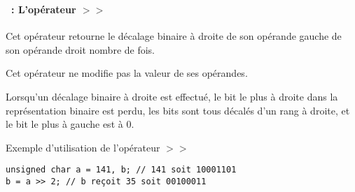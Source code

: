 \begin{frame}[containsverbatim]
  \frametitle{\secname}
  \framesubtitle{\subsecname~: L'opérateur $>>$} 

  Cet opérateur retourne le décalage binaire à droite de son opérande gauche de son opérande droit nombre de fois.
  \par
  Cet opérateur ne modifie pas la valeur de ses opérandes.
  \vspace{0.3cm}
  \par
  Lorsqu'un décalage binaire à droite est effectué, le bit le plus à droite dans la représentation binaire est perdu, les bits sont tous décalés
  d'un rang à droite, et le bit le plus à gauche est à 0.
  \vspace{0.3cm}
  \begin{exampleblock}{Exemple d'utilisation de l'opérateur $>>$}
    \begin{verbatim}
unsigned char a = 141, b; // 141 soit 10001101 
b = a >> 2; // b reçoit 35 soit 00100011\end{verbatim}
  \end{exampleblock}
\end{frame}

